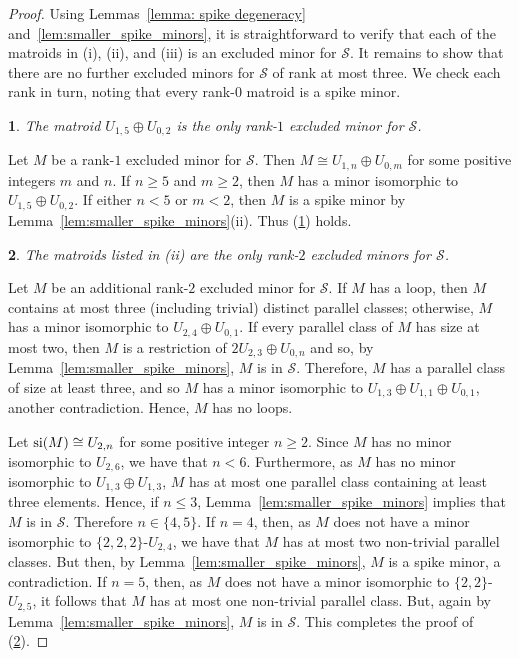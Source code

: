 \documentclass[11pt]{amsart}
\newtheorem{sublemma}{}[theorem]
\numberwithin{equation}{section} %
\newcommand{\si}{{\rm si}}
\newcommand{\cS}{\mathcal{S}}
\begin{document}
\begin{proof}
Using Lemmas~\ref{lemma: spike degeneracy} and~\ref{lem:smaller_spike_minors}, it is straightforward to verify that each of the matroids in (i), (ii), and (iii) is an excluded minor for $\cS$. It remains to show that there are no further excluded minors for $\cS$ of rank at most three. We check each rank in turn, noting that every rank-$0$ matroid is a spike minor.

\begin{sublemma}
The matroid $U_{1,5} \oplus U_{0,2}$ is the only rank-$1$ excluded minor for $\cS$.
\label{rank1}
\end{sublemma}

Let $M$ be a rank-$1$ excluded minor for $\cS$. Then $M\cong U_{1, n}\oplus U_{0, m}$ for some positive integers $m$ and $n$. If $n\geq 5$ and $m\geq 2$, then $M$ has a minor isomorphic to $U_{1,5} \oplus U_{0,2}$. If either $n < 5$ or $m < 2$, then $M$ is a spike minor by Lemma~\ref{lem:smaller_spike_minors}(ii). Thus (\ref{rank1}) holds.

\begin{sublemma}
The matroids listed in (ii) are the only rank-$2$ excluded minors for $\cS$.
\label{rank2}
\end{sublemma}

Let $M$ be an additional rank-$2$ excluded minor for $\cS$. If $M$ has a loop, then $M$ contains at most three (including trivial) distinct parallel classes; otherwise, $M$ has a minor isomorphic to $U_{2,4} \oplus U_{0,1}$. If every parallel class of $M$ has size at most two, then $M$ is a restriction of $2U_{2, 3}\oplus U_{0, n}$ and so, by Lemma~\ref{lem:smaller_spike_minors}, $M$ is in $\cS$. Therefore, $M$ has a parallel class of size at least three, and so $M$ has a minor isomorphic to $U_{1, 3}\oplus U_{1, 1}\oplus U_{0,1}$, another contradiction. Hence, $M$ has no loops.

Let $\si(M)\cong U_{2, n}$ for some positive integer $n\ge 2$. Since $M$ has no minor isomorphic to $U_{2, 6}$, we have that $n < 6$. Furthermore, as $M$ has no minor isomorphic to $U_{1,3} \oplus U_{1,3}$, $M$ has at most one parallel class containing at least three elements. Hence, if $n \leq 3$, Lemma~\ref{lem:smaller_spike_minors} implies that $M$ is in $\cS$. Therefore $n\in \{4, 5\}$. If $n = 4$, then, as $M$ does not have a minor isomorphic to $\{2,2,2\}$-$U_{2, 4}$, we have that $M$ has at most two non-trivial parallel classes. But then, by Lemma~\ref{lem:smaller_spike_minors}, $M$ is a spike minor, a contradiction. If $n = 5$, then, as $M$ does not have a minor isomorphic to $\{2, 2\}$-$U_{2, 5}$, it follows that $M$ has at most one non-trivial parallel class. But, again by Lemma~\ref{lem:smaller_spike_minors}, $M$ is in $\cS$. This completes the proof of (\ref{rank2}).


\end{proof}
\end{document}
